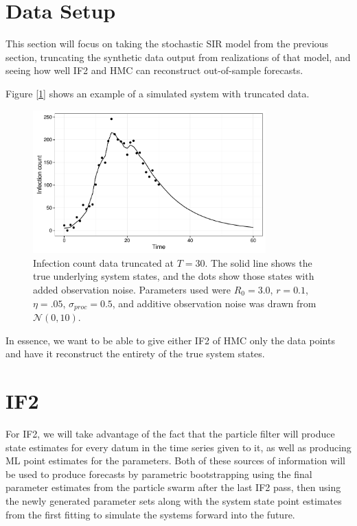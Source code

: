 

\section{Data Setup}

	This section will focus on taking the stochastic SIR model from the previous section, truncating the synthetic data output from realizations of that model, and seeing how well IF2 and HMC can reconstruct out-of-sample forecasts.

	Figure [\ref{sc2dataplot}] shows an example of a simulated system with truncated data.

	\begin{figure}
        \centering
        \captionsetup{width=.8\linewidth}
        \includegraphics[width=0.8\textwidth]{./images/dataplot.pdf}
        \caption{Infection count data truncated at $T = 30$. The solid line shows the true underlying system states, and the dots show those states with added observation noise. Parameters used were $R_0 = 3.0$, $r = 0.1$, $\eta = .05$, $\sigma_{proc} = 0.5$, and additive observation noise was drawn from $\mathcal{N}(0,10)$. \label{sc2dataplot}}
    \end{figure}

	In essence, we want to be able to give either IF2 of HMC only the data points and have it reconstruct the entirety of the true system states.
    

\section{IF2}

	For IF2, we will take advantage of the fact that the particle filter will produce state estimates for every datum in the time series given to it, as well as producing ML point estimates for the parameters. Both of these sources of information will be used to produce forecasts by parametric bootstrapping using the final parameter estimates from the particle swarm after the last IF2 pass, then using the newly generated parameter sets along with the system state point estimates from the first fitting to simulate the systems forward into the future.

